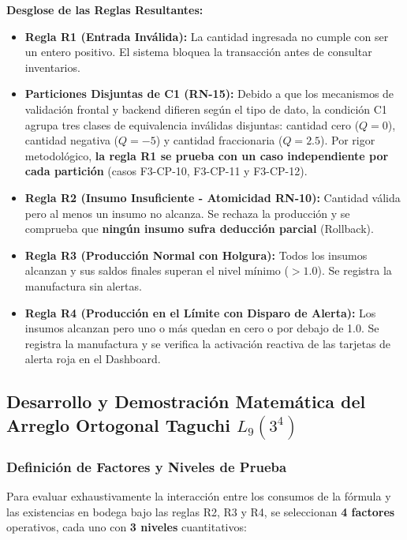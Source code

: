 \documentclass[11pt,a4paper]{article}
\begin{document}
\textbf{Desglose de las Reglas Resultantes:}
\begin{itemize}[noitemsep]
    \item \textbf{Regla R1 (Entrada Inválida):} La cantidad ingresada no cumple con ser un entero positivo. El sistema bloquea la transacción antes de consultar inventarios.
    \item \textbf{Particiones Disjuntas de C1 (RN-15):} Debido a que los mecanismos de validación frontal y backend difieren según el tipo de dato, la condición C1 agrupa tres clases de equivalencia inválidas disjuntas: cantidad cero ($Q=0$), cantidad negativa ($Q=-5$) y cantidad fraccionaria ($Q=2.5$). Por rigor metodológico, \textbf{la regla R1 se prueba con un caso independiente por cada partición} (casos F3-CP-10, F3-CP-11 y F3-CP-12).
    \item \textbf{Regla R2 (Insumo Insuficiente - Atomicidad RN-10):} Cantidad válida pero al menos un insumo no alcanza. Se rechaza la producción y se comprueba que \textbf{ningún insumo sufra deducción parcial} (Rollback).
    \item \textbf{Regla R3 (Producción Normal con Holgura):} Todos los insumos alcanzan y sus saldos finales superan el nivel mínimo ($>1.0$). Se registra la manufactura sin alertas.
    \item \textbf{Regla R4 (Producción en el Límite con Disparo de Alerta):} Los insumos alcanzan pero uno o más quedan en cero o por debajo de 1.0. Se registra la manufactura y se verifica la activación reactiva de las tarjetas de alerta roja en el Dashboard.
\end{itemize}

\subsection{Desarrollo y Demostración Matemática del Arreglo Ortogonal Taguchi $L_9(3^4)$}

\subsubsection{Definición de Factores y Niveles de Prueba}
Para evaluar exhaustivamente la interacción entre los consumos de la fórmula y las existencias en bodega bajo las reglas R2, R3 y R4, se seleccionan \textbf{4 factores} operativos, cada uno con \textbf{3 niveles} cuantitativos:
\end{document}
